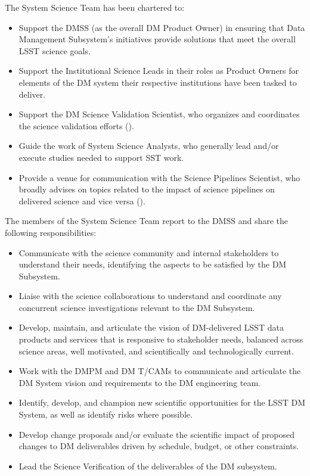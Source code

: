 The System Science Team has been chartered to:
\begin{itemize}
\item Support the \gls{DMSS} (as the overall DM Product Owner) in ensuring that Data Management Subsystem's initiatives provide solutions that meet the overall LSST science goals.
\item Support the Institutional Science Leads in their roles as Product Owners for elements of the DM system their respective institutions have been tasked to deliver.
\item Support the DM Science Validation Scientist, who organizes and coordinates the science validation efforts ().
\item Guide the work of System Science Analysts, who generally lead and/or execute studies needed to support SST work.
\item Provide a venue for communication with the Science Pipelines Scientist, who broadly advises on topics related to the impact of science pipelines on delivered science and vice versa ().
\end{itemize}

The members of the System Science Team report to the \gls{DMSS} and share the following responsibilities:
\begin{itemize}
\item Communicate with the science community and internal stakeholders to understand their needs, identifying the aspects to be satisfied by the DM Subsystem.
\item Liaise with the science collaborations to understand and coordinate any concurrent science investigations relevant to the DM Subsystem.
\item Develop, maintain, and articulate the vision of DM-delivered LSST data products and services that is responsive to stakeholder needs, balanced across science areas, well motivated, and scientifically and technologically current.
\item Work with the \gls{DMPM} and DM \glspl{T/CAM} to communicate and articulate the DM System vision and requirements to the DM engineering team.
\item Identify, develop, and champion new scientific opportunities for the LSST DM System, as well as identify risks where possible.
\item Develop change proposals and/or evaluate the scientific impact of proposed changes to DM deliverables driven by schedule, budget, or other constraints.
\item Lead the Science Verification of the deliverables of the DM subsystem.
\end{itemize}

